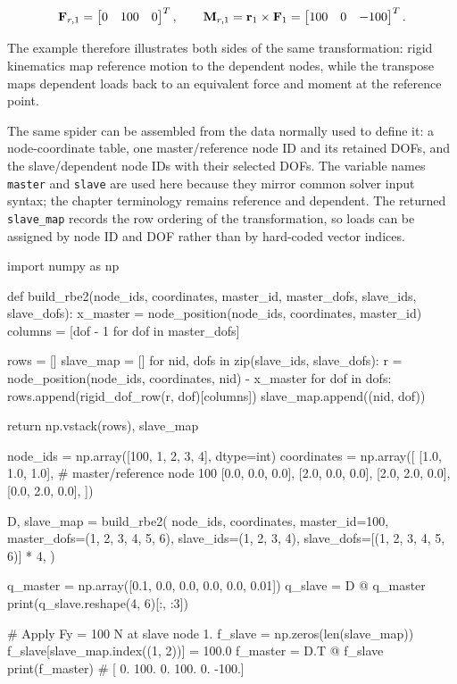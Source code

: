 \begin{equation}
    \mathbf{F}_{r,1}=\begin{bmatrix}0&100&0\end{bmatrix}^{T},
    \qquad
    \mathbf{M}_{r,1}=\mathbf{r}_1\times\mathbf{F}_1
    =\begin{bmatrix}100&0&-100\end{bmatrix}^{T}.
\end{equation}

The example therefore illustrates both sides of the same transformation: rigid
kinematics map reference motion to the dependent nodes, while the transpose maps
dependent loads back to an equivalent force and moment at the reference point.

The same spider can be assembled from the data normally used to define it:
a node-coordinate table, one master/reference node ID and its retained DOFs,
and the slave/dependent node IDs with their selected DOFs. The variable names
\texttt{master} and \texttt{slave} are used here because they mirror common
solver input syntax; the chapter terminology remains reference and dependent.
The returned
\texttt{slave\_map} records the row ordering of the transformation, so loads can
be assigned by node ID and DOF rather than by hard-coded vector indices.

\begin{python}
import numpy as np


def build_rbe2(node_ids, coordinates, master_id, master_dofs,
               slave_ids, slave_dofs):
    x_master = node_position(node_ids, coordinates, master_id)
    columns = [dof - 1 for dof in master_dofs]

    rows = []
    slave_map = []
    for nid, dofs in zip(slave_ids, slave_dofs):
        r = node_position(node_ids, coordinates, nid) - x_master
        for dof in dofs:
            rows.append(rigid_dof_row(r, dof)[columns])
            slave_map.append((nid, dof))

    return np.vstack(rows), slave_map


node_ids = np.array([100, 1, 2, 3, 4], dtype=int)
coordinates = np.array([
    [1.0, 1.0, 1.0],  # master/reference node 100
    [0.0, 0.0, 0.0],
    [2.0, 0.0, 0.0],
    [2.0, 2.0, 0.0],
    [0.0, 2.0, 0.0],
])

D, slave_map = build_rbe2(
    node_ids, coordinates,
    master_id=100,
    master_dofs=(1, 2, 3, 4, 5, 6),
    slave_ids=(1, 2, 3, 4),
    slave_dofs=[(1, 2, 3, 4, 5, 6)] * 4,
)

q_master = np.array([0.1, 0.0, 0.0, 0.0, 0.0, 0.01])
q_slave = D @ q_master
print(q_slave.reshape(4, 6)[:, :3])

# Apply Fy = 100 N at slave node 1.
f_slave = np.zeros(len(slave_map))
f_slave[slave_map.index((1, 2))] = 100.0
f_master = D.T @ f_slave
print(f_master)
# [   0.  100.    0.  100.    0. -100.]
\end{python}

